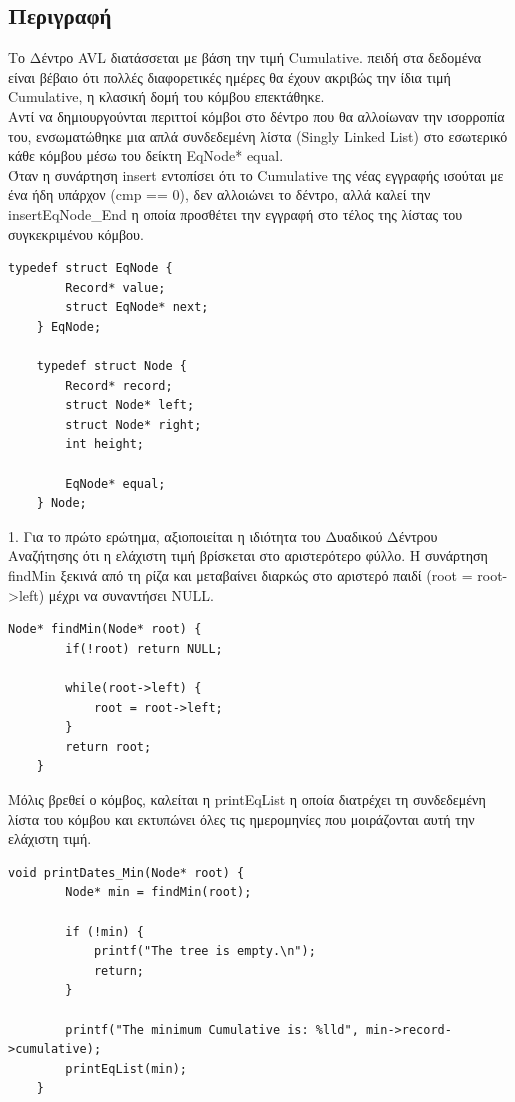 \documentclass[a4paper,12pt]{article}
\begin{document}
\subsection{Περιγραφή}
Το Δέντρο AVL διατάσσεται με βάση την τιμή Cumulative. πειδή στα δεδομένα είναι βέβαιο ότι πολλές διαφορετικές ημέρες θα έχουν ακριβώς την ίδια τιμή Cumulative, η κλασική δομή του κόμβου επεκτάθηκε.\\
Αντί να δημιουργούνται περιττοί κόμβοι στο δέντρο που θα αλλοίωναν την ισορροπία του, ενσωματώθηκε μια απλά συνδεδεμένη λίστα (Singly Linked List) στο εσωτερικό κάθε κόμβου μέσω του δείκτη EqNode* equal.\\
Όταν η συνάρτηση insert εντοπίσει ότι το Cumulative της νέας εγγραφής ισούται με ένα ήδη υπάρχον (cmp == 0), δεν αλλοιώνει το δέντρο, αλλά καλεί την insertEqNode\_End η οποία προσθέτει την εγγραφή στο τέλος της λίστας του συγκεκριμένου κόμβου.\\
\begin{lstlisting}[caption={Δομή κόμβου}]
	typedef struct EqNode {
		Record* value;
		struct EqNode* next;
	} EqNode;
	
	typedef struct Node {
		Record* record;
		struct Node* left;
		struct Node* right;
		int height;
		
		EqNode* equal;
	} Node;
\end{lstlisting}
1. Για το πρώτο ερώτημα, αξιοποιείται η ιδιότητα του Δυαδικού Δέντρου Αναζήτησης ότι η ελάχιστη τιμή βρίσκεται στο αριστερότερο φύλλο. Η συνάρτηση findMin ξεκινά από τη ρίζα και μεταβαίνει διαρκώς στο αριστερό παιδί (root = root->left) μέχρι να συναντήσει NULL.\\
\begin{lstlisting}[caption={Συνάρτηση findMin}]
	Node* findMin(Node* root) {
		if(!root) return NULL;
		
		while(root->left) {
			root = root->left;
		}
		return root;
	}
\end{lstlisting}
Μόλις βρεθεί ο κόμβος, καλείται η printEqList η οποία διατρέχει τη συνδεδεμένη λίστα του κόμβου και εκτυπώνει όλες τις ημερομηνίες που μοιράζονται αυτή την ελάχιστη τιμή.\\
\begin{lstlisting}[caption={Συνάρτηση printDates\_Min}]
	void printDates_Min(Node* root) {
		Node* min = findMin(root);
		
		if (!min) {
			printf("The tree is empty.\n");
			return;
		}
		
		printf("The minimum Cumulative is: %lld", min->record->cumulative);
		printEqList(min);
	}
\end{lstlisting}
\end{document}
